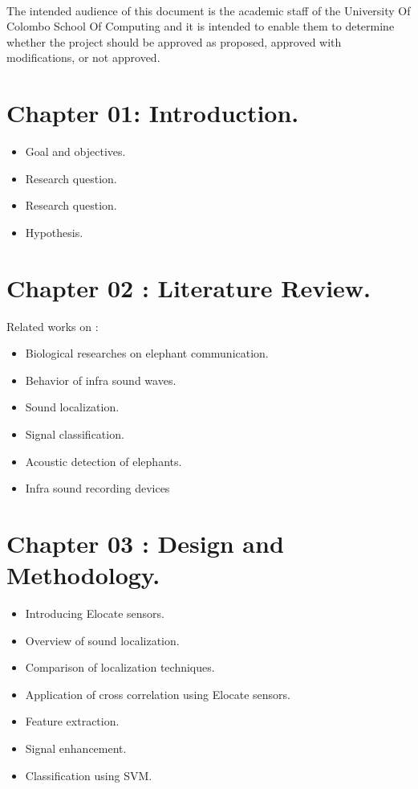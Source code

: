 \documentclass[11pt]{article}
\numberwithin{figure}{section}
\numberwithin{table}{section}
\begin{document}
\paragraph{}
The intended audience of this document is the academic staff of the University Of Colombo School Of Computing and it is intended to enable them to determine whether the project should be approved as proposed, approved with modifications, or not approved.
\newpage
\tableofcontents
\newpage
\section*{Chapter 01: Introduction.}
\begin{itemize}
  \item Goal and objectives.
  \item Research question.
  \item Research question.
  \item Hypothesis.
\end{itemize}

\section*{Chapter 02 : Literature Review.}
Related works on :
\begin{itemize}
  \item Biological researches on elephant communication. 
  \item Behavior of infra sound waves.
  \item Sound localization.
  \item Signal classification.
  \item Acoustic detection of elephants.
  \item Infra sound recording devices
\end{itemize}
\section*{Chapter 03 : Design and Methodology.}
\begin{itemize}
  \item Introducing Elocate sensors.
  \item Overview of sound localization. 
  \item Comparison of localization techniques.
  \item Application of cross correlation using Elocate sensors.
  \item Feature extraction.
  \item Signal enhancement.
  \item Classification using SVM.
\end{itemize}
\end{document}
